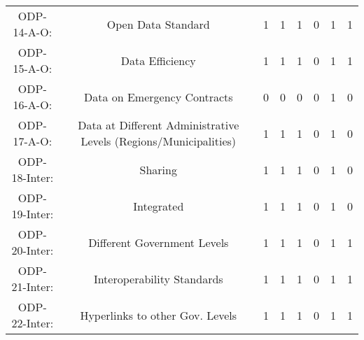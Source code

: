 \documentclass[a4paper, twoside]{report}
\begin{document}
\begin{table}[htbp]
\begin{adjustbox}{max width=\linewidth}
\begin{tabular}{rccccccc}
    \multicolumn{1}{c}{ODP-14-A-O:} & \multicolumn{1}{p{19em}}{\cellcolor[rgb]{ .749,  .749,  .749}Open Data Standard} & \cellcolor[rgb]{ .749,  .749,  .749}1 & \cellcolor[rgb]{ .749,  .749,  .749}1 & \cellcolor[rgb]{ .749,  .749,  .749}1 & \cellcolor[rgb]{ .749,  .749,  .749}0 & \cellcolor[rgb]{ .749,  .749,  .749}1 & \cellcolor[rgb]{ .749,  .749,  .749}1 \\
    \multicolumn{1}{c}{ODP-15-A-O:} & \multicolumn{1}{p{19em}}{Data Efficiency} & 1     & 1     & 1     & 0     & 1     & 1 \\
    \multicolumn{1}{c}{ODP-16-A-O:} & \multicolumn{1}{p{19em}}{\cellcolor[rgb]{ .749,  .749,  .749}Data on Emergency Contracts} & \cellcolor[rgb]{ .749,  .749,  .749}0 & \cellcolor[rgb]{ .749,  .749,  .749}0 & \cellcolor[rgb]{ .749,  .749,  .749}0 & \cellcolor[rgb]{ .749,  .749,  .749}0 & \cellcolor[rgb]{ .749,  .749,  .749}1 & \cellcolor[rgb]{ .749,  .749,  .749}0 \\
    \multicolumn{1}{c}{ODP-17-A-O:} & \multicolumn{1}{p{19em}}{\cellcolor[rgb]{ .749,  .749,  .749}Data at Different Administrative Levels (Regions/Municipalities)} & \cellcolor[rgb]{ .749,  .749,  .749}1 & \cellcolor[rgb]{ .749,  .749,  .749}1 & \cellcolor[rgb]{ .749,  .749,  .749}1 & \cellcolor[rgb]{ .749,  .749,  .749}0 & \cellcolor[rgb]{ .749,  .749,  .749}1 & \cellcolor[rgb]{ .749,  .749,  .749}0 \\
    \midrule
    \multicolumn{1}{c}{ODP-18-Inter:} & \multicolumn{1}{p{19em}}{Sharing} & 1     & 1     & 1     & 0     & 1     & 0 \\
    \multicolumn{1}{c}{ODP-19-Inter:} & \multicolumn{1}{p{19em}}{Integrated} & 1     & 1     & 1     & 0     & 1     & 0 \\
    \multicolumn{1}{c}{ODP-20-Inter:} & \multicolumn{1}{p{19em}}{Different Government Levels} & 1     & 1     & 1     & 0     & 1     & 1 \\
    \multicolumn{1}{c}{ODP-21-Inter:} & \multicolumn{1}{p{19em}}{\cellcolor[rgb]{ .749,  .749,  .749}Interoperability Standards} & \cellcolor[rgb]{ .749,  .749,  .749}1 & \cellcolor[rgb]{ .749,  .749,  .749}1 & \cellcolor[rgb]{ .749,  .749,  .749}1 & \cellcolor[rgb]{ .749,  .749,  .749}0 & \cellcolor[rgb]{ .749,  .749,  .749}1 & \cellcolor[rgb]{ .749,  .749,  .749}1 \\
    \multicolumn{1}{c}{ODP-22-Inter:} & \multicolumn{1}{p{19em}}{\cellcolor[rgb]{ .749,  .749,  .749}Hyperlinks to other Gov. Levels} & \cellcolor[rgb]{ .749,  .749,  .749}1 & \cellcolor[rgb]{ .749,  .749,  .749}1 & \cellcolor[rgb]{ .749,  .749,  .749}1 & \cellcolor[rgb]{ .749,  .749,  .749}0 & \cellcolor[rgb]{ .749,  .749,  .749}1 & \cellcolor[rgb]{ .749,  .749,  .749}1 \\

\end{tabular}
\end{adjustbox}
\end{table}
\end{document}
